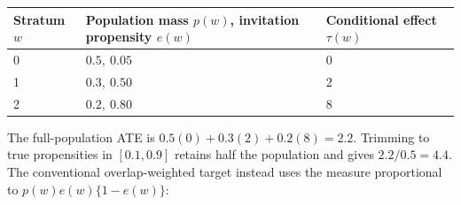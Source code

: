 \begin{longtable}[]{@{}>{\raggedright\arraybackslash}p{}>{\raggedright\arraybackslash}p{}>{\raggedright\arraybackslash}p{}@{}}
\toprule
\begin{minipage}[b]{\linewidth}\raggedright
Stratum \(w\)\strut
\end{minipage} & \begin{minipage}[b]{\linewidth}\raggedright
Population mass \(p(w)\), invitation propensity \(e(w)\)\strut
\end{minipage} & \begin{minipage}[b]{\linewidth}\raggedright
Conditional effect \(\tau(w)\)\strut
\end{minipage}\tabularnewline
\midrule
\endhead
\begin{minipage}[t]{\linewidth}\raggedright
0\strut
\end{minipage} & \begin{minipage}[t]{\linewidth}\raggedright
\(0.5,\ 0.05\)\strut
\end{minipage} & \begin{minipage}[t]{\linewidth}\raggedright
\(0\)\strut
\end{minipage}\tabularnewline
\begin{minipage}[t]{\linewidth}\raggedright
1\strut
\end{minipage} & \begin{minipage}[t]{\linewidth}\raggedright
\(0.3,\ 0.50\)\strut
\end{minipage} & \begin{minipage}[t]{\linewidth}\raggedright
\(2\)\strut
\end{minipage}\tabularnewline
\begin{minipage}[t]{\linewidth}\raggedright
2\strut
\end{minipage} & \begin{minipage}[t]{\linewidth}\raggedright
\(0.2,\ 0.80\)\strut
\end{minipage} & \begin{minipage}[t]{\linewidth}\raggedright
\(8\)\strut
\end{minipage}\tabularnewline
\bottomrule
\end{longtable}

The full-population ATE is \(0.5(0)+0.3(2)+0.2(8)=2.2\). Trimming to
true propensities in \([0.1,0.9]\) retains half the population and gives
\(2.2/0.5=4.4\). The conventional overlap-weighted target instead uses
the measure proportional to \(p(w)e(w)\{1-e(w)\}\):

